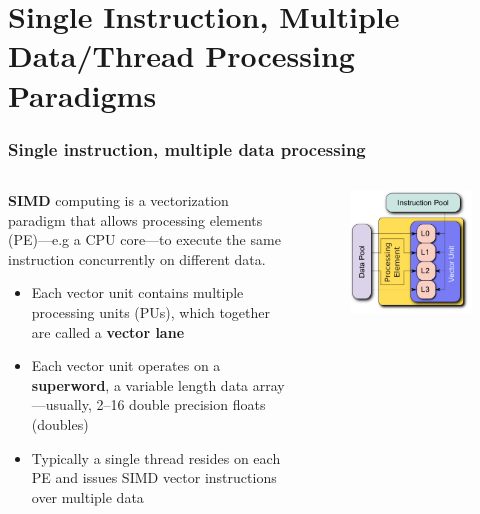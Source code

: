 \documentclass{beamer}
\newcounter{dummynote1}%
\newcounter{dummynote2}%
\begin{document}
\section{Single Instruction, Multiple Data\slash Thread Processing Paradigms}

\begin{frame}
 \frametitle{Single instruction, multiple data processing}
 \setcounter{dummynote1}{\value{footnote}}
 \addtocounter{dummynote1}{1}
 \begin{columns}
 \begin{column}{0.6\textwidth}
  \textbf{SIMD} computing is a vectorization paradigm that allows processing elements (PE)---e.g a CPU core---to execute the same instruction concurrently on different data.
  \begin{itemize}
    \item Each vector unit contains multiple processing units (PUs), which together are called a \textbf{vector lane}
    \item Each vector unit operates on a \textbf{superword}, a variable length data array---usually, \numrange{2}{16} double precision floats (doubles)
    \item Typically a single thread resides on each PE and issues SIMD vector instructions over multiple data
  \end{itemize}
 \end{column}
 \begin{column}{0.4\textwidth}
  \begin{figure}
    \centering
    \includegraphics[width=\columnwidth]{SIMD.pdf}

\end{figure}
\end{column}
\end{columns}
\end{frame}
\end{document}
